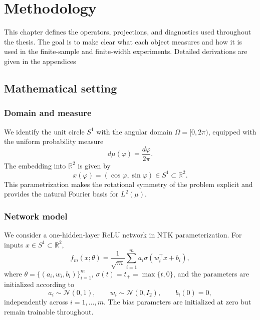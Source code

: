 \chapter{Methodology}\label{cha:methodology}

This chapter defines the operators, projections, and diagnostics used throughout
the thesis. The goal is to make clear what each object measures and how it is
used in the finite-sample and finite-width experiments. Detailed derivations are
given in the appendices

\section{Mathematical setting}

\subsection{Domain and measure}

We identify the unit circle \(S^1\) with the angular domain \(\Omega=[0,2\pi)\), equipped
with the uniform probability measure
\begin{equation}
	d\mu(\varphi)=\frac{d\varphi}{2\pi}.
	\label{eq:method-uniform-measure}
\end{equation}
The embedding into \(\mathbb R^2\) is given by
\begin{equation}
	x(\varphi)=(\cos\varphi,\sin\varphi)\in S^1\subset\mathbb R^2.
	\label{eq:method-circle-embedding}
\end{equation}
This parametrization makes the rotational symmetry of the problem explicit and provides the
natural Fourier basis for \(L^2(\mu)\).

\subsection{Network model}

We consider a one-hidden-layer ReLU network in NTK parameterization. For inputs
\(x\in S^1\subset\mathbb{R}^2\),
\begin{equation}
	f_m(x;\theta)=\frac{1}{\sqrt m}\sum_{i=1}^m a_i \sigma(w_i^\top x+b_i),
	\label{eq:method-network-model}
\end{equation}
where \(\theta=\{(a_i,w_i,b_i)\}_{i=1}^m\), \(\sigma(t)=t_+=\max\{t,0\}\), and the parameters are
initialized according to
\begin{equation}
	a_i \sim \mathcal{N}(0,1),
	\qquad
	w_i \sim \mathcal{N}(0,I_2),
	\qquad
	b_i(0)=0,
	\label{eq:method-network-initialization}
\end{equation}
independently across \(i=1,\dots,m\). The bias parameters are initialized at zero but remain
trainable throughout.

